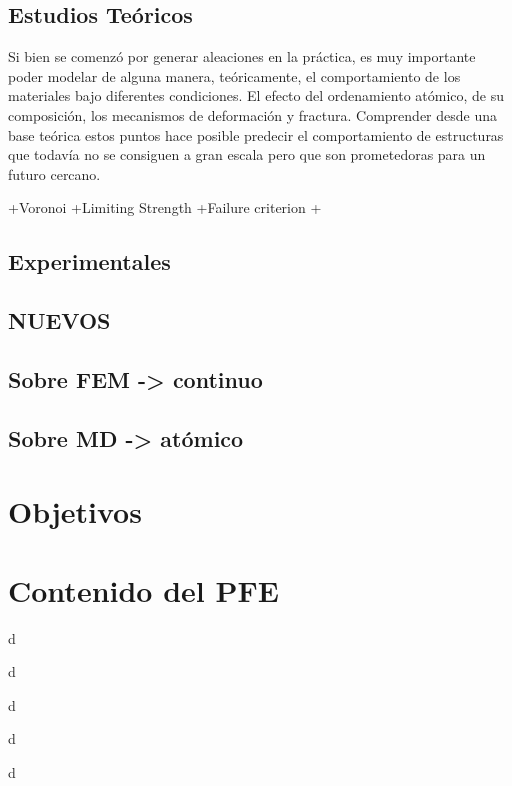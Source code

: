 
\subsection{Estudios Teóricos}
\label{S1_2_1}

Si bien se comenzó por generar aleaciones en la práctica, es muy importante poder modelar de alguna manera, teóricamente, el comportamiento de los materiales bajo diferentes condiciones. El efecto del ordenamiento atómico, de su composición, los mecanismos de deformación y fractura. Comprender desde una base teórica estos puntos hace posible predecir el comportamiento de estructuras que todavía no se consiguen a gran escala pero que son prometedoras para un futuro cercano.

+Voronoi
+Limiting Strength
+Failure criterion
+


\subsection{Experimentales}
\label{S1_2_2}


\subsection{NUEVOS}
\label{S1_2_3}


\subsection{Sobre FEM -> continuo}
\label{S1_2_4}


\subsection{Sobre MD -> atómico}
\label{S1_2_5}


\section{Objetivos}
\label{S1_3}


\section{Contenido del PFE}
\label{S1_4}

d

d

d

d

d